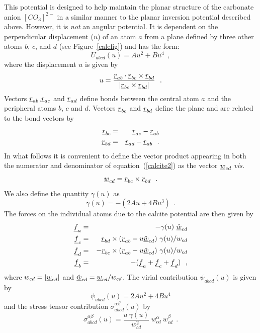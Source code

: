  This potential \cite{rohl-03a,raiteri-10a} is designed to
help maintain the planar structure of the carbonate anion $[CO_{3}]^{2-}$ in a
similar manner to the planar inversion potential described above.  However,
it is {\em not} an angular potential.  It is dependent on the perpendicular
displacement ($u$) of an atom $a$ from a plane defined by three other atoms
$b$, $c$, and $d$ (see Figure~\ref{calcfig}) and has the form:
\begin{equation}
U_{abcd}(u)=Au^{2}+Bu^{4}~~, \label{calcite1}
\end{equation}
where the displacement $u$ is given by
\begin{equation}
u=\frac{\mbox{$\underline{r}$}_{ab}\cdot\mbox{$\underline{r}$}_{bc}\times\mbox{$\underline{r}$}_{bd}}{|\mbox{$\underline{r}$}_{bc}\times\mbox{$\underline{r}$}_{bd}|}~~. \label{calcite2}
\end{equation}
Vectors $\mbox{$\underline{r}$}_{ab}$,$\mbox{$\underline{r}$}_{ac}$ and $\mbox{$\underline{r}$}_{ad}$ define bonds between
the central atom $a$ and the peripheral atoms $b$, $c$ and $d$.  Vectors
$\mbox{$\underline{r}$}_{bc}$ and $\mbox{$\underline{r}$}_{bd}$ define the plane and are related to the bond
vectors by
\begin{eqnarray}
\mbox{$\underline{r}$}_{bc}&=&\mbox{$\underline{r}$}_{ac}-\mbox{$\underline{r}$}_{ab} \nonumber \\
\mbox{$\underline{r}$}_{bd}&=&\mbox{$\underline{r}$}_{ad}-\mbox{$\underline{r}$}_{ab}~~.
\end{eqnarray}
In what follows it is convenient to define the vector product appearing in
both the numerator and denominator of equation~(\ref{calcite2}) as the vector
$\mbox{$\underline{w}$}_{cd}$ {\em vis.}
\begin{equation}
\mbox{$\underline{w}$}_{cd}=\mbox{$\underline{r}$}_{bc}\times\mbox{$\underline{r}$}_{bd}~~.
\end{equation}
We also define the quantity $\gamma(u)$ as
\begin{equation}
\gamma(u)=-(2Au+4Bu^{3})~~.
\end{equation}
The forces on the individual atoms due to the calcite potential are
then given by
\begin{eqnarray}
\mbox{$\underline{f}$}_{a}&=&-\gamma(u)~\hat{\mbox{$\underline{w}$}}_{cd} \nonumber \\
\mbox{$\underline{f}$}_{c}&=&\phantom{+}\mbox{$\underline{r}$}_{bd}\times(\mbox{$\underline{r}$}_{ab}-u\hat{\mbox{$\underline{w}$}}_{cd})~\gamma(u)/w_{cd} \nonumber \\
\mbox{$\underline{f}$}_{d}&=&-\mbox{$\underline{r}$}_{bc}\times(\mbox{$\underline{r}$}_{ab}- u\hat{\mbox{$\underline{w}$}}_{cd})~\gamma(u)/w_{cd} \\
\mbox{$\underline{f}$}_{b}&=&-(\mbox{$\underline{f}$}_{a}+\mbox{$\underline{f}$}_{c}+\mbox{$\underline{f}$}_{d})~~,\nonumber
\end{eqnarray}
where $w_{cd}=|\mbox{$\underline{w}$}_{cd}|$ and $\hat{\mbox{$\underline{w}$}}_{cd}=\mbox{$\underline{w}$}_{cd}/w_{cd}$.
The virial contribution $\psi_{abcd}(u)$ is given by
\begin{equation}
\psi_{abcd}(u)=2Au^{2}+4Bu^{4}
\end{equation}
and the stress tensor contribution $\sigma_{abcd}^{\alpha\beta}(u)$ by
\begin{equation}
\sigma_{abcd}^{\alpha\beta}(u)=\frac{u~\gamma(u)}{w_{cd}^{2}}~w_{cd}^{\alpha}~w_{cd}^{\beta}~~.
\end{equation}

